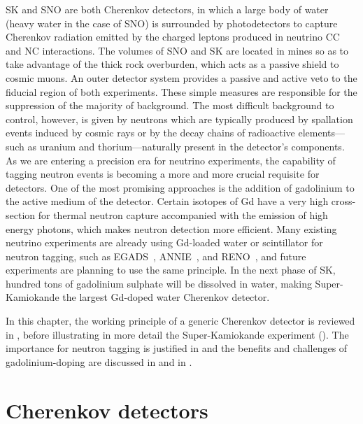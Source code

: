 SK and SNO are both Cherenkov detectors, in which a large body of water (heavy water in the case of SNO) is surrounded by %
photodetectors to capture Cherenkov radiation emitted by the charged leptons produced in neutrino CC and NC interactions.
The volumes of SNO and SK are located in mines so as to take advantage of the thick rock overburden, %
which acts as a passive shield to cosmic muons.
An outer detector system provides a passive and active veto to the fiducial region of both experiments.
These simple measures are responsible for the suppression of the majority of background.
The most difficult background to control, however, is given by neutrons which are typically produced by spallation events %
induced by cosmic rays or by the decay chains of radioactive elements---such as uranium and thorium---naturally %
present in the detector's components.
As we are entering a precision era for neutrino experiments, the capability of tagging neutron %
events is becoming a more and more crucial requisite for detectors.
One of the most promising approaches is the addition of gadolinium to the active medium of the detector.
Certain isotopes of Gd have a very high cross-section for thermal neutron capture %
accompanied with the emission of high energy photons, which makes neutron detection more efficient.
Many existing neutrino experiments are already using Gd-loaded water or scintillator for neutron tagging, %
such as EGADS~\cite{Ikeda:2019pcm}, ANNIE~\cite{Back:2019aqi}, and RENO~\cite{Ahn:2010vy}, %
and future experiments are planning to use the same principle.
In the next phase of SK, hundred tons of gadolinium sulphate will be dissolved in water, making %
Super-Kamiokande the largest Gd-doped water Cherenkov detector.

In this chapter, the working principle of a generic Cherenkov detector is reviewed in , %
before illustrating in more detail the Super-Kamiokande experiment ().
The importance for neutron tagging is justified in  %
and the benefits and challenges of gadolinium-doping are discussed in  and in .

\section{Cherenkov detectors}
\label{sec:wch}


